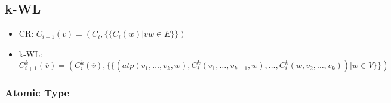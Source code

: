 \subsection{k-WL}
\begin{itemize}
    \item CR: $C_{i+1}(v) = \left( C_i, \{\{ C_i(w) | vw \in E\}\}\right)$
    \item k-WL: $C_{i+1}^k(\overline{v}) = \left( C_i^k(\overline{v}), \{\{ ( atp(v_1,\dots,v_k,w), C_i^k(v_1,\dots,v_{k-1},w),\dots,C_i^k(w,v_2,\dots,v_k)) | w \in V\}\}\right)$
\end{itemize}


\subsubsection{Atomic Type}



